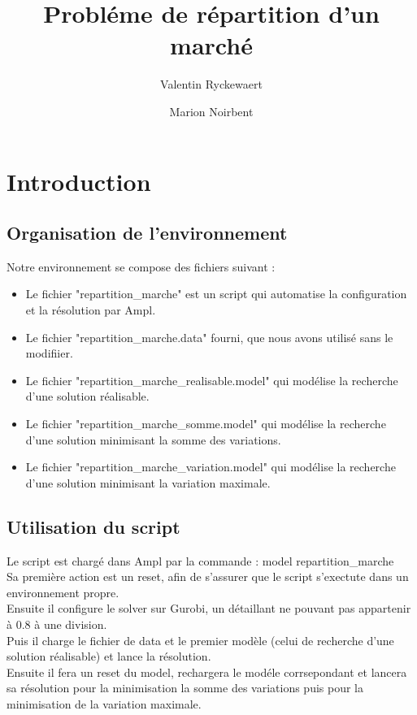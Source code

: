\documentclass[a4paper,12pt,oneside]{report}
\title{Probléme de répartition d’un marché}
\author{Valentin Ryckewaert \and Marion Noirbent}
\begin{document}
\maketitle
\tableofcontents

\chapter{Introduction}

\section{Organisation de l'environnement}
Notre environnement se compose des fichiers suivant :\\
\begin{itemize}
\item Le fichier "repartition\_marche" est un script qui automatise la configuration et la résolution par Ampl.
\item Le fichier "repartition\_marche.data" fourni, que nous avons utilisé sans le modifiier.
\item Le fichier "repartition\_marche\_realisable.model" qui modélise la recherche d'une solution réalisable.
\item Le fichier "repartition\_marche\_somme.model" qui modélise la recherche d'une solution minimisant la somme des variations.
\item Le fichier "repartition\_marche\_variation.model" qui modélise la recherche d'une solution minimisant la variation maximale.
\end{itemize}

\section{Utilisation du script}
Le script est chargé dans Ampl par la commande :  model repartition\_marche\\

Sa première action est un reset, afin de s'assurer que le script s'exectute dans un environnement propre.\\
Ensuite il configure le solver sur Gurobi, un détaillant ne pouvant pas appartenir à 0.8 à une division.\\
Puis il charge le fichier de data et le premier modèle (celui de recherche d'une solution réalisable) et lance la résolution.\\
Ensuite il fera un reset du model, rechargera le modéle corrsepondant et lancera sa résolution pour la minimisation la somme des variations puis pour la minimisation de la variation maximale.
\end{document}
